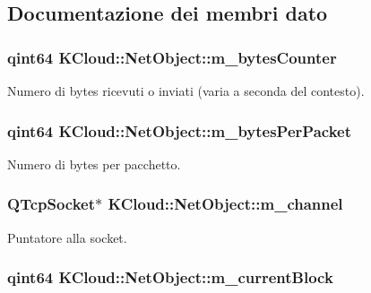 \subsection{Documentazione dei membri dato}
\hypertarget{class_k_cloud_1_1_net_object_a98879b8a704faa1d218ddb9d2cc57f89}{
\subsubsection[{m\-\_\-bytes\-Counter}]{\setlength{\rightskip}{0pt plus 5cm}qint64 K\-Cloud\-::\-Net\-Object\-::m\-\_\-bytes\-Counter\hspace{0.3cm}{\ttfamily [protected]}}}\label{class_k_cloud_1_1_net_object_a98879b8a704faa1d218ddb9d2cc57f89}
Numero di bytes ricevuti o inviati (varia a seconda del contesto). \hypertarget{class_k_cloud_1_1_net_object_a3b8a0e077659f9a2081b4fd7128cf744}{
\subsubsection[{m\-\_\-bytes\-Per\-Packet}]{\setlength{\rightskip}{0pt plus 5cm}qint64 K\-Cloud\-::\-Net\-Object\-::m\-\_\-bytes\-Per\-Packet\hspace{0.3cm}{\ttfamily [protected]}}}\label{class_k_cloud_1_1_net_object_a3b8a0e077659f9a2081b4fd7128cf744}
Numero di bytes per pacchetto. \hypertarget{class_k_cloud_1_1_net_object_a124b1e5128388353ec7995365ab19424}{
\subsubsection[{m\-\_\-channel}]{\setlength{\rightskip}{0pt plus 5cm}Q\-Tcp\-Socket$\ast$ K\-Cloud\-::\-Net\-Object\-::m\-\_\-channel\hspace{0.3cm}{\ttfamily [protected]}}}\label{class_k_cloud_1_1_net_object_a124b1e5128388353ec7995365ab19424}
Puntatore alla socket. \hypertarget{class_k_cloud_1_1_net_object_a3de377affcaa5f8f236c4ec6caee5e44}{
\subsubsection[{m\-\_\-current\-Block}]{\setlength{\rightskip}{0pt plus 5cm}qint64 K\-Cloud\-::\-Net\-Object\-::m\-\_\-current\-Block\hspace{0.3cm}{\ttfamily [protected]}}}\label{class_k_cloud_1_1_net_object_a3de377affcaa5f8f236c4ec6caee5e44}
